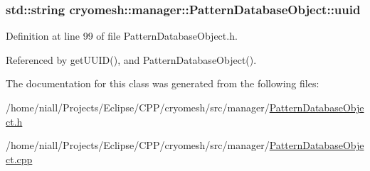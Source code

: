 \hypertarget{classcryomesh_1_1manager_1_1PatternDatabaseObject_a1bd568034f9f9d08b5ebb7386417f149}{
\subsubsection[{uuid}]{\setlength{\rightskip}{0pt plus 5cm}std\-::string {\bf cryomesh\-::manager\-::\-Pattern\-Database\-Object\-::uuid}}}\label{classcryomesh_1_1manager_1_1PatternDatabaseObject_a1bd568034f9f9d08b5ebb7386417f149}


\-Definition at line 99 of file \-Pattern\-Database\-Object.\-h.



\-Referenced by get\-U\-U\-I\-D(), and \-Pattern\-Database\-Object().



\-The documentation for this class was generated from the following files\-:\begin{DoxyCompactItemize}
\item 
/home/niall/\-Projects/\-Eclipse/\-C\-P\-P/cryomesh/src/manager/\hyperlink{PatternDatabaseObject_8h}{\-Pattern\-Database\-Object.\-h}\item 
/home/niall/\-Projects/\-Eclipse/\-C\-P\-P/cryomesh/src/manager/\hyperlink{PatternDatabaseObject_8cpp}{\-Pattern\-Database\-Object.\-cpp}\end{DoxyCompactItemize}
